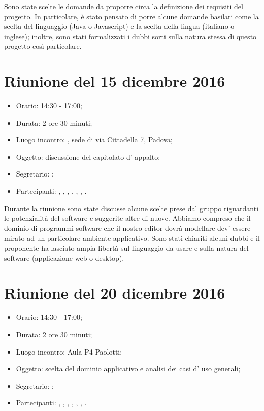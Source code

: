 Sono state scelte le domande da proporre circa la definizione dei requisiti del progetto. In particolare, è stato pensato di porre alcune domande basilari come la scelta del linguaggio (Java o Javascript) e la scelta della lingua (italiano o inglese); inoltre, sono stati formalizzati i dubbi sorti sulla natura stessa di questo progetto così particolare.



\section{Riunione del 15 dicembre 2016}

\begin{itemize}
	\item Orario: 14:30 - 17:00;
	\item Durata: 2 ore 30 minuti;
	\item Luogo incontro: \ZU, sede di via Cittadella 7, Padova; 
	\item Oggetto: discussione del capitolato d' appalto;
	\item Segretario: \LS; 
	\item Partecipanti: \GP, \AZ, \GG, \LB, \LS, \MM, \PB.
\end{itemize}

Durante la riunione sono state discusse alcune scelte prese dal gruppo riguardanti le potenzialità del software e suggerite altre di nuove. Abbiamo compreso che il dominio di programmi software che il nostro editor dovrà modellare dev' essere mirato ad un particolare ambiente applicativo. Sono stati chiariti alcuni dubbi e il proponente ha lasciato ampia libertà sul linguaggio da usare e sulla natura del software (applicazione web o desktop).



\section{Riunione del 20 dicembre 2016}

\begin{itemize}
	\item Orario: 14:30 - 17:00;
	\item Durata: 2 ore 30 minuti;
	\item Luogo incontro: Aula P4 Paolotti; 
	\item Oggetto: scelta del dominio applicativo e analisi dei casi d' uso generali;
	\item Segretario: \PB; 
	\item Partecipanti: \GP, \AZ, \GG, \LB, \LS, \MM, \PB.
\end{itemize}

